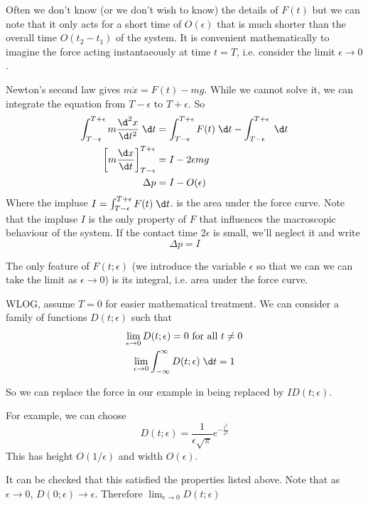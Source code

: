 \documentclass[a4paper]{article}
\begin{document}
Often we don't know (or we don't wish to know) the details of $F(t)$ but we can note that it only acts for a short time of $O(\epsilon)$ that is much shorter than the overall time $O(t_2 - t_1)$ of the system. It is convenient mathematically to imagine the force acting instantaeously at time $t = T$, i.e. consider the limit $\epsilon\to 0$.

Newton's second law gives $m\ddot x = F(t) - mg$. While we cannot solve it, we can integrate the equation from $T - \epsilon$ to $T + \epsilon$. So 
\begin{align*}
  \int_{T - \epsilon}^{T + \epsilon} m\frac{\d ^2 x}{\d t^2}\;\d t &= \int_{T - \epsilon}^{T + \epsilon} F(t)\;\d t - \int_{T - \epsilon}^{T + \epsilon}\;\d t\\
  \left[ m\frac{\d x}{\d t}\right]^{T + \epsilon}_{T - \epsilon} &= I - 2\epsilon mg\\
  \Delta p &= I - O(\epsilon)
\end{align*}
Where the impluse $I = \int_{T - \epsilon}^{T + \epsilon} F(t) \;\d t$. is the area under the force curve. Note that the impluse $I$ is the only property of $F$ that influences the macroscopic behaviour of the system. If the contact time $2\epsilon$ is small, we'll neglect it and write 
\[
\Delta p = I
\]

The only feature of $F(t; \epsilon)$ (we introduce the variable $\epsilon$ so that we can we can take the limit as $\epsilon \to 0$) is its integral, i.e. area under the force curve.

WLOG, assume $T = 0$ for easier mathematical treatment. We can consider a family of functions $D(t; \epsilon)$ such that 
\begin{gather*}
\lim_{\epsilon\to 0} D(t; \epsilon) = 0 \text{ for all }t \not= 0\\
\lim_{\epsilon\to 0}\int_{-\infty}^\infty D(t; \epsilon) \;\d t = 1
\end{gather*}

So we can replace the force in our example in being replaced by $ID(t; \epsilon)$.

For example, we can choose 
\[
D(t; \epsilon) = \frac{1}{\epsilon\sqrt{\pi}}e^{-\frac{t^2}{\epsilon^2}}
\]
This has height $O(1/\epsilon)$ and width $O(\epsilon)$.

It can be checked that this satisfied the properties listed above. Note that as $\epsilon \to 0$, $D(0; \epsilon)\to \epsilon$. Therefore $\displaystyle \lim_{\epsilon\to 0} D(t; \epsilon)$
\end{document}
